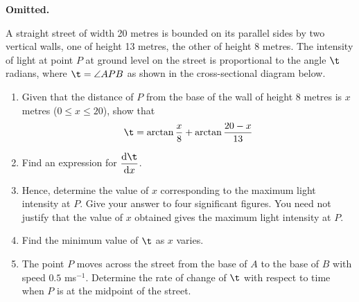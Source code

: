 \documentclass{echw}
\begin{document}
    \problem{}
        \textbf{Omitted.}

    \problem{}
        A straight street of width 20 metres is bounded on its parallel sides by two vertical walls, one of height 13 metres, the other of height 8 metres. The intensity of light at point $P$ at ground level on the street is proportional to the angle $\t$ radians, where $\t = \angle APB$ as shown in the cross-sectional diagram below.

        \begin{center}
        \end{center}

        \begin{enumerate}
            \item Given that the distance of $P$ from the base of the wall of height 8 metres is $x$ metres ($0 \leq x \leq 20$), show that
            \begin{equation*}
                \t = \arctan \dfrac{x}8 + \arctan \dfrac{20-x}{13}
            \end{equation*}
            \item Find an expression for $\der{\t}{x}$.
            \item Hence, determine the value of $x$ corresponding to the maximum light intensity at $P$. Give your answer to four significant figures. You need not justify that the value of $x$ obtained gives the maximum light intensity at $P$.
            \item Find the minimum value of $\t$ as $x$ varies.
            \item The point $P$ moves across the street from the base of $A$ to the base of $B$ with speed $0.5$ ms$^{-1}$. Determine the rate of change of $\t$ with respect to time when $P$ is at the midpoint of the street.
        \end{enumerate}
\end{document}
